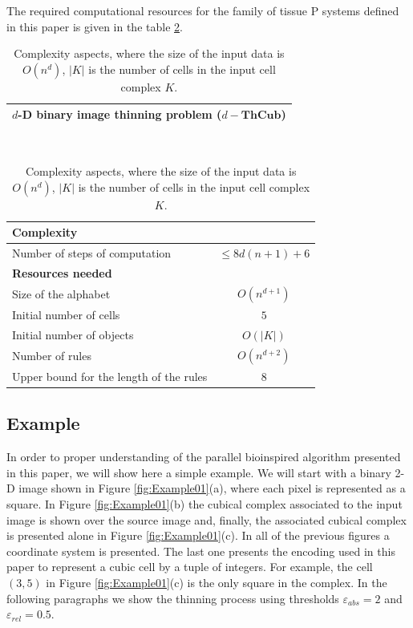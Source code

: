 \documentclass[journal]{IEEEtran}
\begin{document}
The required computational resources for the family of tissue P systems defined
in this paper is given in the table \ref{table: Complexity Aspects}.
\begin{table}[t!]
\begin{center}
\begin{tabular}{|c|}
\hline
$d$-D binary image thinning problem ($d-\mathbf{ThCub}$)\\
\hline
\end{tabular}\\
\begin{tabular}{|l|c|}
	\hline
	\textbf{Complexity}                     &  \\ 
	\hline
	Number of steps of computation          & $\leq 8d(n+1)+6$ \\ 
	\hline\hline
	\textbf{Resources needed}               &  \\ 
	\hline
	Size of the alphabet                    &   $O(n^{d+1})$   \\
	Initial number of cells                 &       $5$        \\
	Initial number of objects               &     $O(|K|)$     \\
	Number of rules                         &   $O(n^{d+2})$   \\
	Upper bound for the length of the rules &       $8$        \\ 
	\hline
\end{tabular}\caption{Complexity aspects, where the size of the input data is $O(n^d)$,
$|K|$ is the number of cells in the input cell complex $K$.}\label{table: Complexity Aspects}
\end{center}
\end{table}

\subsection{Example}
In order to proper understanding of the parallel bioinspired algorithm presented in this 
paper, we will show here a simple example. We will start with a binary 2-D image shown in
Figure \ref{fig:Example01}(a), where each pixel is represented as a square. In Figure 
\ref{fig:Example01}(b) the cubical complex associated to the input image is shown over the 
source image and, finally, the associated cubical complex is presented alone in Figure 
\ref{fig:Example01}(c). In all of the previous figures a coordinate system is presented. 
The last one presents the encoding used in this paper to represent a cubic cell by a tuple of 
integers. For example, the cell $(3,5)$ in Figure \ref{fig:Example01}(c) is the only square in
the complex. In the following paragraphs we show the thinning process using thresholds 
$\varepsilon_{abs}=2$ and $\varepsilon_{rel}=0.5$.
 
\end{document}
